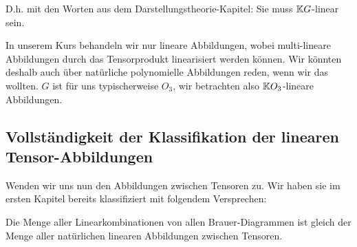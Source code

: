 \begin{remark}
D.h. mit den Worten aus dem Darstellungstheorie-Kapitel: Sie muss $\mathbb{K} G$-linear sein.
\end{remark}

\begin{remark}
In unserem Kurs behandeln wir nur lineare Abbildungen, wobei multi-lineare Abbildungen durch das Tensorprodukt linearisiert werden können. Wir könnten deshalb auch über natürliche polynomielle Abbildungen reden, wenn wir das wollten. $G$ ist für uns typischerweise $O_3$, wir betrachten also $\mathbb{K} O_3$-lineare Abbildungen.
\end{remark}

\subsection{Vollständigkeit der Klassifikation der linearen Tensor-Abbildungen}
Wenden wir uns nun den Abbildungen zwischen Tensoren zu. Wir haben sie im ersten Kapitel bereits klassifiziert mit folgendem Versprechen:
\begin{theorem}
	\label{brauer:klassifikation}
	Die Menge aller Linearkombinationen von allen Brauer-Diagrammen ist gleich der Menge aller natürlichen linearen Abbildungen zwischen Tensoren.
\end{theorem}
